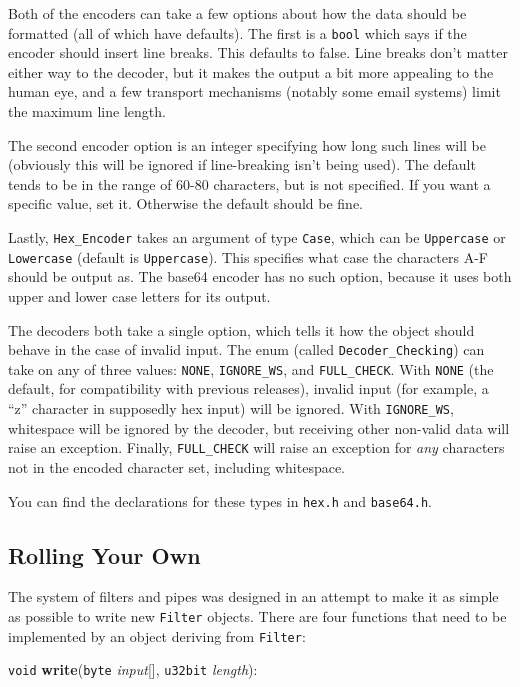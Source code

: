 \documentclass{article}
\newcommand{\filename}[1]{\texttt{#1}}
\newcommand{\function}[1]{\textbf{#1}}
\newcommand{\type}[1]{\texttt{#1}}
\renewcommand{\arg}[1]{\textsl{#1}}
\begin{document}
Both of the encoders can take a few options about how the data should be
formatted (all of which have defaults). The first is a \type{bool} which
says if the encoder should insert line breaks. This defaults to
false. Line breaks don't matter either way to the decoder, but it makes the
output a bit more appealing to the human eye, and a few transport mechanisms
(notably some email systems) limit the maximum line length.

The second encoder option is an integer specifying how long such lines will be
(obviously this will be ignored if line-breaking isn't being used). The default
tends to be in the range of 60-80 characters, but is not specified. If
you want a specific value, set it. Otherwise the default should be fine.

Lastly, \type{Hex\_Encoder} takes an argument of type \type{Case}, which can be
\type{Uppercase} or \type{Lowercase} (default is \type{Uppercase}). This
specifies what case the characters A-F should be output as. The base64 encoder
has no such option, because it uses both upper and lower case letters for its
output.

The decoders both take a single option, which tells it how the object
should behave in the case of invalid input. The enum (called
\type{Decoder\_Checking}) can take on any of three values:
\type{NONE}, \type{IGNORE\_WS}, and \type{FULL\_CHECK}. With
\type{NONE} (the default, for compatibility with previous releases),
invalid input (for example, a ``z'' character in supposedly hex input)
will be ignored. With \type{IGNORE\_WS}, whitespace will be ignored by
the decoder, but receiving other non-valid data will raise an
exception. Finally, \type{FULL\_CHECK} will raise an exception for
\emph{any} characters not in the encoded character set, including
whitespace.

You can find the declarations for these types in \filename{hex.h} and
\filename{base64.h}.

\subsection{Rolling Your Own}

The system of filters and pipes was designed in an attempt to make it
as simple as possible to write new \type{Filter} objects. There are
four functions that need to be implemented by an object deriving from
\type{Filter}:

\noindent
\type{void} \function{write}(\type{byte} \arg{input}[], \type{u32bit}
\arg{length}):
\end{document}
